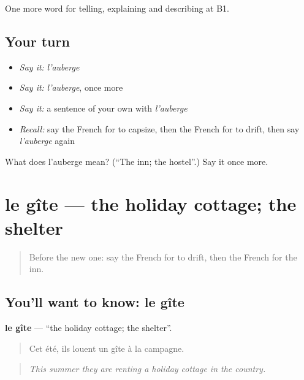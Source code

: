 \begin{grammarlens}[title={What you've built}]
One more word for telling, explaining and describing at B1.
\end{grammarlens}

\subsection*{Your turn}
\begin{itemize}
\raggedright
  \item \emph{Say it:} \emph{l'auberge}
  \item \emph{Say it:} \emph{l'auberge}, once more
  \item \emph{Say it:} a sentence of your own with \emph{l'auberge}
  \item \emph{Recall:} say the French for to capsize, then the French for to drift, then say \emph{l'auberge} again
\end{itemize}

\begin{tcolorbox}[breakable,colback=teal!4,colframe=teal!35!black,title={Before you move on}]
What does l'auberge mean? (\textquotedblleft{}The inn; the hostel\textquotedblright{}.) Say it once more.
\end{tcolorbox}
\section[le gîte]{le gîte — the holiday cottage; the shelter}

\label{lesson:FR-C424-gite}



\begin{quote}
Before the new one: say the French for to drift, then the French for the inn.
\end{quote}

\subsection*{You'll want to know: le gîte}
\textbf{le gîte} — \textquotedblleft{}the holiday cottage; the shelter\textquotedblright{}.

\begin{quote}
Cet été, ils louent un gîte à la campagne.
\end{quote}

\begin{quote}
\emph{This summer they are renting a holiday cottage in the country.}
\end{quote}

